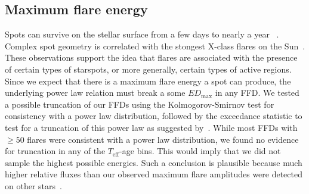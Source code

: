 \documentclass{aa}
\begin{document}
\subsection{Maximum flare energy}
\label{sec:sec:maxen}
Spots can survive on the stellar surface from a few days to nearly a year~
\citep{namekata_solarstellarwlf_2017, davenport_flaresandspots_2015}. Complex spot geometry is correlated with the stongest X-class flares on the Sun~\citep{toriumi_flaresspotssun_2017, sammis_deltaspotsflares_2000}. These observations support the idea that flares are associated with the presence of certain types of starspots, or more generally, certain types of active regions. Since we expect that there is a maximum flare energy a spot can produce, the underlying power law relation must break a some $ED_\mathrm{max}$ in any FFD. We tested a possible truncation of our FFDs using the Kolmogorov-Smirnov test for consistency with a power law distribution, followed by the exceedance statistic to test for a truncation of this power law as suggested by~\citet{maschberger2009}. While most FFDs with $\geqslant50$ flares were consistent with a power law distribution, we found no evidence for truncation in any of the $T_\mathrm{eff}$-age bins. This would imply that we did not sample the highest possible energies. Such a conclusion is plausible because much higher relative fluxes than our observed maximum flare amplitudes were detected on other stars~\citep{paudel_monsterucdflare_2018, jackman2019, schmidt2016}.
\end{document}
